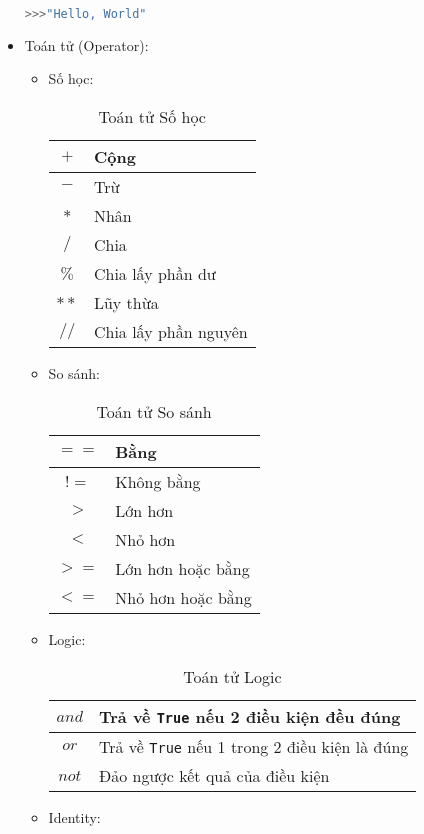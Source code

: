 \begin{itemize}
\begin{lstlisting}[language=Python]
>>>"Hello, World"
	\end{lstlisting}
	\item Toán tử (Operator):
	\begin{itemize}
		\item Số học:
		\begin{table}[!ht]
			\centering
			\begin{tabular}{|c|l|}
				\hline
				$+$ & Cộng\\
				\hline
				$-$ & Trừ\\
				\hline
				$*$ & Nhân\\
				\hline
				$/$ & Chia\\
				\hline
				$\%$ & Chia lấy phần dư\\
				\hline
				$**$ & Lũy thừa\\
				\hline
				$//$ & Chia lấy phần nguyên\\
				\hline
			\end{tabular}
			\caption{Toán tử Số học}
		\end{table}
		\item So sánh:
		\begin{table}[!ht]
			\centering
			\begin{tabular}{|c|l|}
				\hline
				$==$ & Bằng\\
				\hline
				$!=$ & Không bằng\\
				\hline
				$>$ & Lớn hơn\\
				\hline
				$<$ & Nhỏ hơn\\
				\hline
				$>=$ & Lớn hơn hoặc bằng\\
				\hline
				$<=$ & Nhỏ hơn hoặc bằng\\
				\hline
			\end{tabular}
			\caption{Toán tử So sánh}
		\end{table}
		\item Logic:
		\begin{table}[!ht]
			\centering
			\begin{tabular}{|c|l|}
				\hline
				$and$ & Trả về \texttt{True} nếu 2 điều kiện đều đúng\\
				\hline
				$or$ & Trả về \texttt{True} nếu 1 trong 2 điều kiện là đúng\\
				\hline
				$not$ & Đảo ngược kết quả của điều kiện\\
				\hline
			\end{tabular}
			\caption{Toán tử Logic}
		\end{table}
		\item Identity:
		\begin{table}[!ht]

\end{table}
\end{itemize}
\end{itemize}
